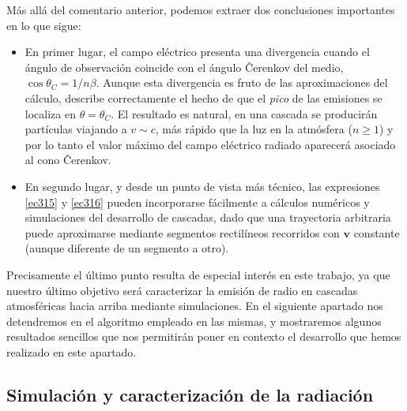 \documentclass[11 pt, a4paper]{article} %
\numberwithin{equation}{section}
\numberwithin{figure}{section}
\numberwithin{table}{section}
\newcommand{\vect}[1]{\boldsymbol{\mathbf{#1}}}
\begin{document}
Más allá del comentario anterior, podemos extraer dos conclusiones importantes en lo que sigue:
\begin{itemize}
	\item En primer lugar, el campo eléctrico presenta una divergencia cuando el ángulo de observación coincide con el ángulo \v{C}erenkov del medio, $\cos{\theta_C}=1/n\beta$. Aunque esta divergencia es fruto de las aproximaciones del cálculo, describe correctamente el hecho de que el \textit{pico} de las emisiones se localiza en $\theta=\theta_C$. El resultado es natural, en una cascada se producirán partículas viajando a $v\sim c$, más rápido que la luz en la atmósfera ($n\geq 1$) y por lo tanto el valor máximo del campo eléctrico radiado aparecerá asociado al cono \v{C}erenkov.
	\item En segundo lugar, y desde un punto de vista más técnico, las expresiones \eqref{ec315} y \eqref{ec316} pueden incorporarse fácilmente a cálculos numéricos y simulaciones del desarrollo de cascadas, dado que una trayectoria arbitraria puede aproximarse mediante segmentos rectilíneos recorridos con $\vect{v}$ constante (aunque diferente de un segmento a otro).
\end{itemize}

Precisamente el último punto resulta de especial interés en este trabajo, ya que nuestro último objetivo será caracterizar la emisión de radio en cascadas atmosféricas hacia arriba mediante simulaciones. En el siguiente apartado nos detendremos en el algoritmo empleado en las mismas, y mostraremos algunos resultados sencillos que nos permitirán poner en contexto el desarrollo que hemos realizado en este apartado.

	\subsection{Simulación y caracterización de la radiación}\label{sec32}
\end{document}
